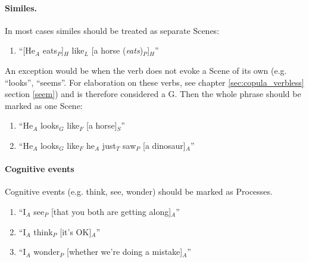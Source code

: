 \documentclass[11pt]{article}
\newcommand{\be}{\begin{enumerate}}
\newcommand{\ee}{\end{enumerate}}
\newcommand{\rem}[1]{{(\it #1})}
\begin{document}


\paragraph{Similes.} In most cases similes should be treated as separate Scenes:
\be
\item
``[He$_A$ eats$_P$]$_H$ like$_L$ [a horse \rem{eats}$_P$]$_H$''
\ee

An exception would be when the verb does not evoke a Scene of its own (e.g. ``looks'', ``seems''. For elaboration on these verbs, see chapter \ref {sec:copula_verbless} section \ref{seem}) and is therefore considered a G. Then the whole phrase should be marked as one Scene:
\be
\item
``He$_A$ looks$_G$ like$_F$ [a horse]$_S$''
\item
``He$_A$ looks$_G$ like$_F$ he$_A$ just$_T$ saw$_P$ [a dinosaur]$_A$''
\ee




\paragraph{Cognitive events} Cognitive events (e.g. think, see, wonder) should be marked as Processes. 

\be 
\item 
``I$_A$ see$_P$ [that you both are getting along]$_A$''
\item
``I$_A$ think$_P$ [it's OK]$_A$''
\item
``I$_A$ wonder$_P$ [whether we're doing a mistake]$_A$''
\ee
\end{document}

